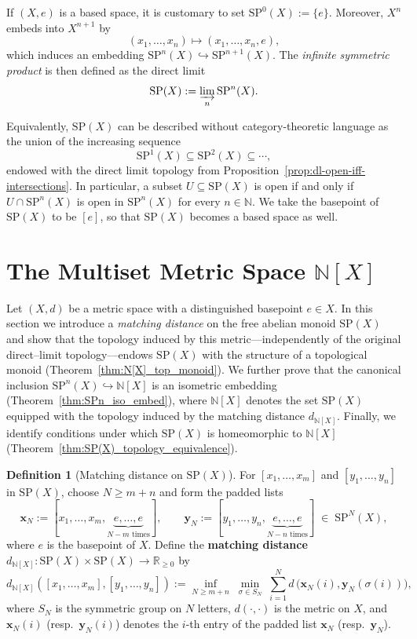 \documentclass[10pt,a4paper]{article}
\theoremstyle{definition}
\newtheorem{definition}[theorem]{Definition}
\newcommand{\SP}{\mathrm{SP}}
\newcommand{\N}{\mathbb{N}}
\begin{document}
If $(X,e)$ is a based space, it is customary to set $\SP^{0}(X) := \{e\}$.
Moreover, $X^{n}$ embeds into $X^{n+1}$ by
\[
(x_{1},\dots,x_{n}) \longmapsto (x_{1},\dots,x_{n},e),
\]
which induces an embedding $\SP^{n}(X) \hookrightarrow \SP^{n+1}(X)$.
The \emph{infinite symmetric product} is then defined as the direct limit
\[
\SP(X) := \varinjlim_{n} \SP^{n}(X).
\]

Equivalently, $\SP(X)$ can be described without category-theoretic language
as the union of the increasing sequence
\[
\SP^{1}(X) \subseteq \SP^{2}(X) \subseteq \cdots,
\]
endowed with the direct limit topology from
Proposition~\ref{prop:dl-open-iff-intersections}.
In particular, a subset $U \subseteq \SP(X)$ is open if and only if
$U \cap \SP^{n}(X)$ is open in $\SP^{n}(X)$ for every $n \in \N$.
We take the basepoint of $\SP(X)$ to be $[e]$, so that $\SP(X)$ becomes a
based space as well.








\section{The Multiset Metric Space {$\N[X]$}}\label{sec:N[X]_met}
Let $(X,d)$ be a metric space with a distinguished basepoint $e \in X$.  
In this section we introduce a \emph{matching distance} on the free abelian
monoid $\SP(X)$ and show that the topology induced by this metric—independently
of the original direct--limit topology—endows $\SP(X)$ with the structure of a
topological monoid (Theorem~\ref{thm:N[X]_top_monoid}). We further prove that
the canonical inclusion $\SP^n(X) \hookrightarrow \N[X]$ is an isometric
embedding (Theorem~\ref{thm:SPn_iso_embed}), where $\N[X]$ denotes the set
$\SP(X)$ equipped with the topology induced by the matching distance
$d_{\N[X]}$. Finally, we identify conditions under which $\SP(X)$ is
homeomorphic to $\N[X]$ (Theorem~\ref{thm:SP(X)_topology_equivalence}).






\begin{definition}[Matching distance on {$\SP(X)$}]\label{def:SP(X)_metric}
For $[x_1,\dots,x_m]$ and $[y_1,\dots,y_n]$ in $\SP(X)$, choose
$N \ge m+n$ and form the padded lists
\[
\mathbf{x}_N := [x_1,\dots,x_m,\underbrace{e,\dots,e}_{N-m\text{ times}}],
\qquad
\mathbf{y}_N := [y_1,\dots,y_n,\underbrace{e,\dots,e}_{N-n\text{ times}}]
\;\in\; \SP^{N}(X),
\]
where $e$ is the basepoint of $X$. Define the \textbf{matching distance} $d_{\N[X]} : \SP(X) \times \SP(X) \longrightarrow \mathbb{R}_{\ge 0}$ by
\[
d_{\N[X]}([x_1,\dots,x_m],[y_1,\dots,y_n])
:= \inf_{N \ge m+n}\;
\min_{\sigma \in S_N}\;
\sum_{i=1}^{N} d\,\bigl(\mathbf{x}_N(i), \mathbf{y}_N(\sigma(i))\bigr),
\]
where $S_N$ is the symmetric group on $N$ letters, $d(\cdot,\cdot)$ is the
metric on $X$, and $\mathbf{x}_N(i)$ (resp.\ $\mathbf{y}_N(i)$) denotes the
$i$-th entry of the padded list $\mathbf{x}_N$ (resp.\ $\mathbf{y}_N$).
\end{definition}
\end{document}
